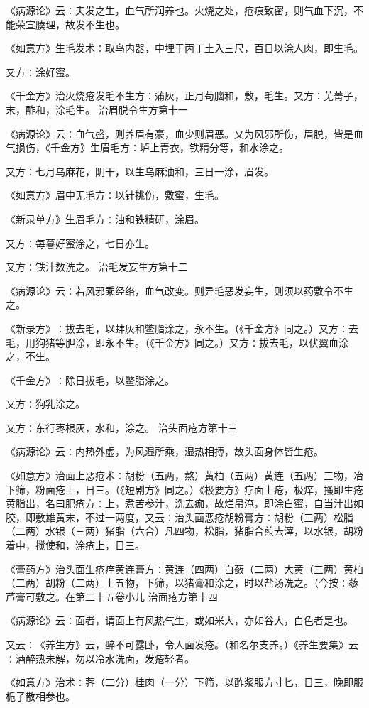 \documentclass[a4paper,12pt,UTF8,twoside]{ctexbook}
\begin{document}
《病源论》云∶夫发之生，血气所润养也。火烧之处，疮痕致密，则气血下沉，不能荣宣腠理，故发不生也。

《如意方》生毛发术∶取鸟内器，中埋于丙丁土入三尺，百日以涂人肉，即生毛。

又方∶涂好蜜。

《千金方》治火烧疮发毛不生方∶蒲灰，正月苟脑和，敷，毛生。又方∶芜菁子，末，酢和，涂毛生。
治眉脱令生方第十一

《病源论》云∶血气盛，则养眉有豪，血少则眉恶。又为风邪所伤，眉脱，皆是血气损伤，《千金方》生眉毛方∶垆上青衣，铁精分等，和水涂之。

又方∶七月乌麻花，阴干，以生乌麻油和，三日一涂，眉发。

《如意方》眉中无毛方∶以针挑伤，敷蜜，生毛。

《新录单方》生眉毛方∶油和铁精研，涂眉。

又方∶每暮好蜜涂之，七日亦生。

又方∶铁汁数洗之。
治毛发妄生方第十二

《病源论》云∶若风邪乘经络，血气改变。则异毛恶发妄生，则须以药敷令不生之。

《新录方》∶拔去毛，以蚌灰和鳖脂涂之，永不生。（《千金方》同之。）又方∶去毛，用狗猪等胆涂，即永不生。（《千金方》同之。）又方∶拔去毛，以伏翼血涂之，不生。

《千金方》∶除日拔毛，以鳖脂涂之。

又方∶狗乳涂之。

又方∶东行枣根灰，水和，涂之。
治头面疮方第十三

《病源论》云∶内热外虚，为风湿所乘，湿热相搏，故头面身体皆生疮。

《如意方》治面上恶疮术∶胡粉（五两，熬）黄柏（五两）黄连（五两）三物，冶下筛，粉面疮上，日三。（《短剧方》同之。）《极要方》疗面上疮，极痒，搔即生疮黄脂出，名曰肥疮方∶上，煮苦参汁，洗去痂，故烂帛淹，即涂白蜜，自当汁出如胶，即敷雄黄末，不过一两度，又云∶治头面恶疮胡粉膏方∶胡粉（三两）松脂（二两）水银（三两）猪脂（六合）凡四物，松脂，猪脂合煎去滓，以水银，胡粉着中，搅使和，涂疮上，日三。

《膏药方》治头面生疮痒黄连膏方∶黄连（四两）白蔹（二两）大黄（三两）黄柏（二两）胡粉（二两）上五物，下筛，以猪膏和涂之，时以盐汤洗之。（今按∶藜芦膏可敷之。在第二十五卷小儿
治面疮方第十四

《病源论》云∶面者，谓面上有风热气生，或如米大，亦如谷大，白色者是也。

又云∶《养生方》云，醉不可露卧，令人面发疮。（和名尔支养。）《养生要集》云∶酒醉热未解，勿以冷水洗面，发疮轻者。

《如意方》治术∶荠（二分）桂肉（一分）下筛，以酢浆服方寸匕，日三，晚即服栀子散相参也。
\end{document}
